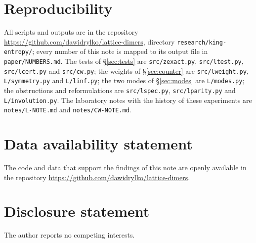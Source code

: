 \documentclass[11pt]{amsart}
\theoremstyle{definition}
\theoremstyle{remark}
\newcommand{\file}[1]{\texttt{#1}}
\begin{document}
\section*{Reproducibility}
{\sloppy All scripts and outputs are in the repository \url{https://github.com/dawidrylko/lattice-dimers},
directory \texttt{research/king-entropy/}; every number of this note is mapped to its output file in
\file{paper/NUMBERS.md}. The tests of \S\ref{sec:tests} are \file{src/zexact.py},
\file{src/ltest.py}, \file{src/lcert.py} and \file{src/cw.py}; the weights of \S\ref{sec:counter}
are \file{src/lweight.py}, \file{L/symmetry.py} and \file{L/linf.py}; the two modes of
\S\ref{sec:modes} are \file{L/modes.py}; the obstructions and reformulations are
\file{src/lspec.py}, \file{src/lparity.py} and \file{L/involution.py}. The laboratory notes with the
history of these experiments are \file{notes/L-NOTE.md} and \file{notes/CW-NOTE.md}.\par}

\section*{Data availability statement}
The code and data that support the findings of this note are openly available in the repository
\url{https://github.com/dawidrylko/lattice-dimers}.

\section*{Disclosure statement}
The author reports no competing interests.



\end{document}
